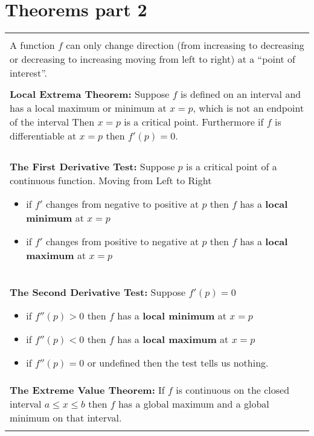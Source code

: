 \documentclass[12pt]{report}
\newenvironment{boxe}
    {\begin{center}
    \begin{tabular}{|p{0.9\textwidth}|}
    \hline\\
    }
    { 
    \\\\\hline
    \end{tabular} 
    \end{center}
    }
\begin{document}
\section*{Theorems part 2}
\begin{boxe}
    A function $f$ can only change direction (from increasing to decreasing or decreasing to increasing moving from left to right) at a ``point of interest''.\\\\

    \textbf{Local Extrema Theorem:} Suppose $f$ is defined on an interval and has a local maximum or minimum at $x=p$, which is not an endpoint of the interval Then $x=p$ is a critical point. Furthermore if $f$ is differentiable at $x=p$ then $f'(p)=0$.\\\\
    
    \textbf{The First Derivative Test:} Suppose $p$ is a critical point of a continuous function. Moving from Left to Right
    \begin{itemize}
        \item if $f'$ changes from negative to positive at $p$ then $f$ has a \textbf{local minimum} at $x=p$
        \item if $f'$ changes from positive to negative at $p$ then $f$ has a \textbf{local maximum} at $x=p$
    \end{itemize}\\

    \textbf{The Second Derivative Test:} Suppose $f'(p)=0$
    \begin{itemize}
        \item if $f''(p)>0$ then $f$ has a \textbf{local minimum} at $x=p$
        \item if $f''(p)<0$ then $f$ has a \textbf{local maximum} at $x=p$
        \item if $f''(p)=0$ or undefined then the test tells us nothing.
    \end{itemize}\\

    \textbf{The Extreme Value Theorem:} If $f$ is continuous on the closed interval $a\leq x\leq b$ then $f$ has a global maximum and a global minimum on that interval.
\end{boxe}
\end{document}
